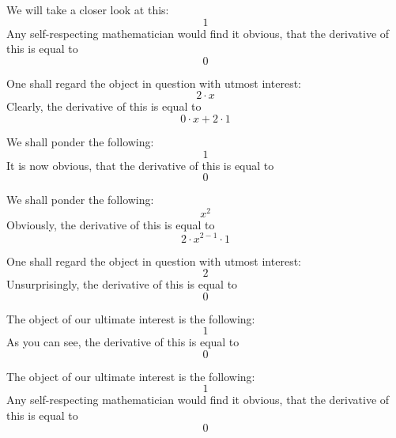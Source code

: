\documentclass{article}
\begin{document}
We will take a closer look at this:
\begin{equation}
1 
\end{equation}
Any self-respecting mathematician would find it obvious, that the derivative of this is equal to
\begin{equation}
0 
\end{equation}

One shall regard the object in question with utmost interest:
\begin{equation}
2 \cdot x 
\end{equation}
Clearly, the derivative of this is equal to
\begin{equation}
0 \cdot x + 2 \cdot 1 
\end{equation}

We shall ponder the following:
\begin{equation}
1 
\end{equation}
It is now obvious, that the derivative of this is equal to
\begin{equation}
0 
\end{equation}

We shall ponder the following:
\begin{equation}
x ^{2 } 
\end{equation}
Obviously, the derivative of this is equal to
\begin{equation}
2 \cdot x ^{2 - 1 } \cdot 1 
\end{equation}

One shall regard the object in question with utmost interest:
\begin{equation}
2 
\end{equation}
Unsurprisingly, the derivative of this is equal to
\begin{equation}
0 
\end{equation}

The object of our ultimate interest is the following:
\begin{equation}
1 
\end{equation}
As you can see, the derivative of this is equal to
\begin{equation}
0 
\end{equation}

The object of our ultimate interest is the following:
\begin{equation}
1 
\end{equation}
Any self-respecting mathematician would find it obvious, that the derivative of this is equal to
\begin{equation}
0 
\end{equation}
\end{document}
